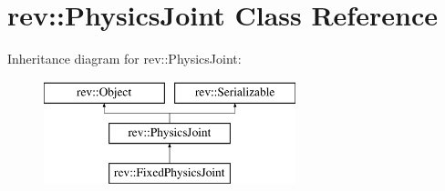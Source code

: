 \hypertarget{classrev_1_1_physics_joint}{}\section{rev\+::Physics\+Joint Class Reference}
\label{classrev_1_1_physics_joint}
Inheritance diagram for rev\+::Physics\+Joint\+:\begin{figure}[H]
\begin{center}
\leavevmode
\includegraphics[height=3.000000cm]{classrev_1_1_physics_joint}
\end{center}
\end{figure}
